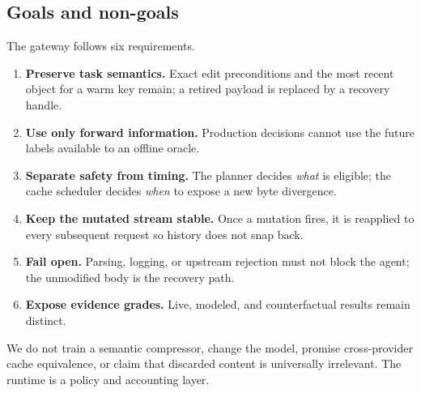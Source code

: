 \documentclass[10pt,twocolumn]{article}
\begin{document}
\subsection{Goals and non-goals}

The gateway follows six requirements.

\begin{enumerate}
  \item \textbf{Preserve task semantics.}  Exact edit preconditions and the most recent object for a
  warm key remain; a retired payload is replaced by a recovery handle.
  \item \textbf{Use only forward information.}  Production decisions cannot use the future labels
  available to an offline oracle.
  \item \textbf{Separate safety from timing.}  The planner decides \emph{what} is eligible; the cache
  scheduler decides \emph{when} to expose a new byte divergence.
  \item \textbf{Keep the mutated stream stable.}  Once a mutation fires, it is reapplied to every
  subsequent request so history does not snap back.
  \item \textbf{Fail open.}  Parsing, logging, or upstream rejection must not block the agent; the
  unmodified body is the recovery path.
  \item \textbf{Expose evidence grades.}  Live, modeled, and counterfactual results remain distinct.
\end{enumerate}

We do not train a semantic compressor, change the model, promise cross-provider cache equivalence, or
claim that discarded content is universally irrelevant.  The runtime is a policy and accounting layer.
\end{document}
